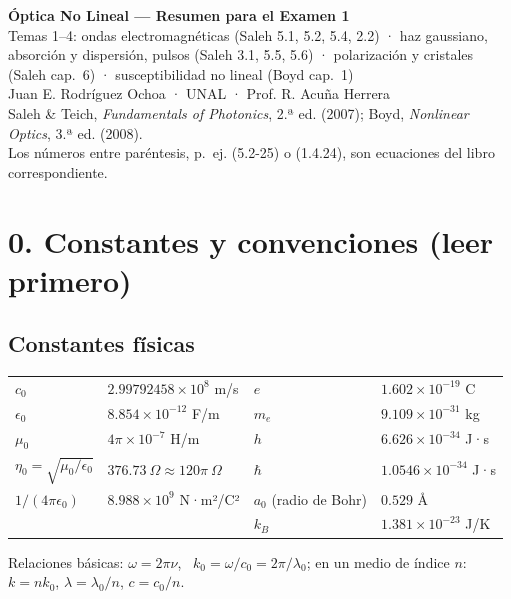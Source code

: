 \documentclass[10pt]{article}
\begin{document}
\begin{center}
{\LARGE\bfseries\color{tema} Óptica No Lineal — Resumen para el Examen 1}\\[1ex]
{\normalsize Temas 1–4: ondas electromagnéticas (Saleh 5.1, 5.2, 5.4, 2.2) · haz gaussiano, absorción y dispersión, pulsos (Saleh 3.1, 5.5, 5.6) · polarización y cristales (Saleh cap.~6) · susceptibilidad no lineal (Boyd cap.~1)}\\[1ex]
{\small Juan E. Rodríguez Ochoa · UNAL · Prof. R. Acuña Herrera\\
Saleh \& Teich, \emph{Fundamentals of Photonics}, 2.ª ed. (2007); Boyd, \emph{Nonlinear Optics}, 3.ª ed. (2008).\\
Los números entre paréntesis, p.~ej. (5.2-25) o (1.4.24), son ecuaciones del libro correspondiente.}
\end{center}

\tableofcontents

\section*{0. Constantes y convenciones (leer primero)}

\subsection*{Constantes físicas}
\begin{center}
\renewcommand{\arraystretch}{1.25}
\begin{tabular}{@{}ll@{\qquad}ll@{}}
\toprule
$c_0$ & $2.99792458\times10^{8}$ m/s & $e$ & $1.602\times10^{-19}$ C\\
$\epsilon_0$ & $8.854\times10^{-12}$ F/m & $m_e$ & $9.109\times10^{-31}$ kg\\
$\mu_0$ & $4\pi\times10^{-7}$ H/m & $h$ & $6.626\times10^{-34}$ J·s\\
$\eta_0=\sqrt{\mu_0/\epsilon_0}$ & $376.73\ \Omega\approx120\pi\ \Omega$ & $\hbar$ & $1.0546\times10^{-34}$ J·s\\
$1/(4\pi\epsilon_0)$ & $8.988\times10^{9}$ N·m²/C² & $a_0$ (radio de Bohr) & $0.529$ Å\\
 & & $k_B$ & $1.381\times10^{-23}$ J/K\\
\bottomrule
\end{tabular}
\end{center}
Relaciones básicas: $\omega=2\pi\nu$, \ $k_0=\omega/c_0=2\pi/\lambda_0$; en un medio de índice $n$: $k=nk_0$, $\lambda=\lambda_0/n$, $c=c_0/n$.
\end{document}
